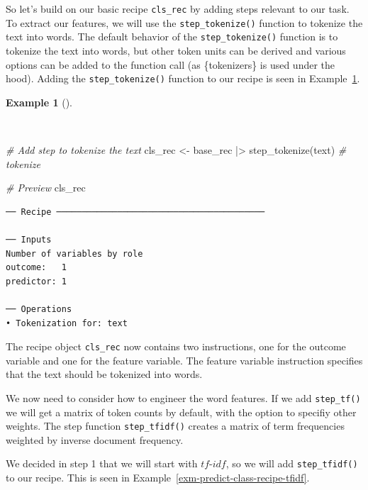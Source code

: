 \documentclass[
  letterpaper,
  krantz1]{latex/krantz-mod}
\newenvironment{Shaded}{\begin{snugshade}}{\end{snugshade}}
\newcommand{\CommentTok}[1]{\textcolor[rgb]{0.00,0.00,0.00}{\textit{#1}}}
\newcommand{\FunctionTok}[1]{\textcolor[rgb]{0.00,0.00,0.00}{#1}}
\newcommand{\NormalTok}[1]{\textcolor[rgb]{0.00,0.00,0.00}{#1}}
\newcommand{\OtherTok}[1]{\textcolor[rgb]{0.00,0.00,0.00}{#1}}
\newcommand{\SpecialCharTok}[1]{\textcolor[rgb]{0.00,0.00,0.00}{#1}}
\theoremstyle{definition}
\newtheorem{example}{Example}[chapter]
\theoremstyle{definition}
\theoremstyle{remark}
\begin{document}
So let's build on our basic recipe \texttt{cls\_rec} by adding steps
relevant to our task. To extract our features, we will use the
\texttt{step\_tokenize()} function to tokenize the text into words. The
default behavior of the \texttt{step\_tokenize()} function is to
tokenize the text into words, but other token units can be derived and
various options can be added to the function call (as \{tokenizers\} is
used under the hood). Adding the \texttt{step\_tokenize()} function to
our recipe is seen in Example~\ref{exm-predict-class-recipe-tokenize}.

\begin{example}[]\protect\hypertarget{exm-predict-class-recipe-tokenize}{}\label{exm-predict-class-recipe-tokenize}

~

\begin{Shaded}
\begin{Highlighting}[numbers=left,,]
\CommentTok{\# Add step to tokenize the text}
\NormalTok{cls\_rec }\OtherTok{\textless{}{-}}
\NormalTok{  base\_rec }\SpecialCharTok{|\textgreater{}}
  \FunctionTok{step\_tokenize}\NormalTok{(text) }\CommentTok{\# tokenize}

\CommentTok{\# Preview}
\NormalTok{cls\_rec}
\end{Highlighting}
\end{Shaded}

\pagebreak

\begin{verbatim}
── Recipe ─────────────────────────────────────────

── Inputs
Number of variables by role
outcome:   1
predictor: 1

── Operations
• Tokenization for: text
\end{verbatim}

\end{example}

The recipe object \texttt{cls\_rec} now contains two instructions, one
for the outcome variable and one for the feature variable. The feature
variable instruction specifies that the text should be tokenized into
words.

We now need to consider how to engineer the word features. If we add
\texttt{step\_tf()} we will get a matrix of token counts by default,
with the option to specifiy other weights. The step function
\texttt{step\_tfidf()} creates a matrix of term frequencies weighted by
inverse document frequency.

We decided in step 1 that we will start with \(tf\)-\(idf\), so we will
add \texttt{step\_tfidf()} to our recipe. This is seen in
Example~\ref{exm-predict-class-recipe-tfidf}.
\end{document}
